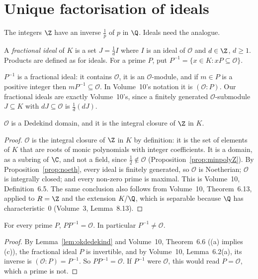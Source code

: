 \section{Unique factorisation of ideals}

The integers $\Z$ have an inverse $\frac1p$ of $p$ in $\Q$. Ideals need the analogue.

\begin{definition}
A \emph{fractional ideal} of $K$ is a set $J=\frac1d I$ where $I$ is an ideal of $\mathcal O$ and $d\in\Z$, $d\ge1$.
Products are defined as for ideals. For a prime $P$, put $P^{-1}=\{x\in K:xP\subseteq\mathcal O\}$.
\end{definition}

$P^{-1}$ is a fractional ideal: it contains $\mathcal O$, it is an $\mathcal O$-module, and if $m\in P$ is a positive
integer then $mP^{-1}\subseteq\mathcal O$. In Volume~10's notation it is $(\mathcal O:P)$. Our fractional ideals are
exactly Volume~10's, since a finitely generated $\mathcal O$-submodule $J\subseteq K$ with $dJ\subseteq\mathcal O$ is
$\frac1d(dJ)$.

\begin{lemma}\label{lem:okdedekind}
$\mathcal O$ is a Dedekind domain, and it is the integral closure of $\Z$ in $K$.
\end{lemma}
\begin{proof}
$\mathcal O$ is the integral closure of $\Z$ in $K$ by definition: it is the set of elements of $K$ that are roots of monic
polynomials with integer coefficients. It is a domain, as a subring of $\C$, and not a field, since $\frac12\notin\mathcal O$
(Proposition~\ref{prop:minpolyZ}). By Proposition~\ref{prop:noeth}, every ideal is finitely generated, so $\mathcal O$ is
Noetherian; $\mathcal O$ is integrally closed; and every non-zero prime is maximal. This is Volume~10,
Definition~6.5. The same conclusion also follows from Volume~10, Theorem~6.13, applied to $R=\Z$ and the extension
$K/\Q$, which is separable because $\Q$ has characteristic~$0$ (Volume~3, Lemma~8.13).
\end{proof}

\begin{lemma}\label{lem:missing}
For every prime $P$, $PP^{-1}=\mathcal O$. In particular $P^{-1}\ne\mathcal O$.
\end{lemma}
\begin{proof}
By Lemma~\ref{lem:okdedekind} and Volume~10, Theorem~6.6 ((a) implies (c)), the fractional ideal $P$ is invertible, and
by Volume~10, Lemma~6.2(a), its inverse is $(\mathcal O:P)=P^{-1}$. So $PP^{-1}=\mathcal O$. If $P^{-1}$ were $\mathcal O$,
this would read $P=\mathcal O$, which a prime is not.
\end{proof}


